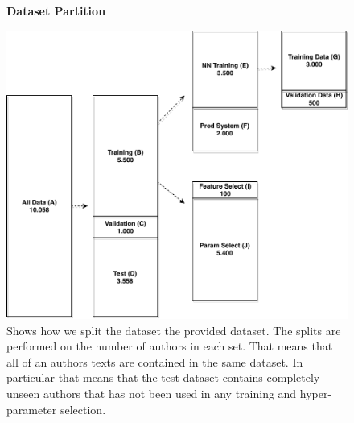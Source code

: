 \begin{figure}
    \centering
    \textbf{Dataset Partition}\par\medskip
    \includegraphics[width=.6\textwidth]{./pictures/data/data_split}
    \caption{Shows how we split the dataset the provided dataset. The splits are
    performed on the number of authors in each set. That means that all of an
    authors texts are contained in the same dataset. In particular that means
    that the test dataset contains completely unseen authors that has not been
    used in any training and hyper-parameter selection.}
    \label{fig:data_split}
\end{figure}

